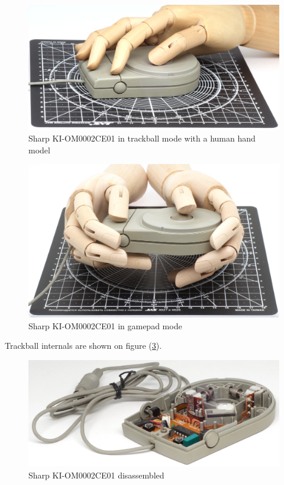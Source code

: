 \documentclass[11pt, a4paper]{article}
\begin{document}
\begin{figure}[h]
    \centering
    \includegraphics[scale=0.45]{1987_sharp_convertible/handball_30.jpg}
    \caption{Sharp KI-OM0002CE01 in trackball mode with a human hand model}
    \label{fig:SharpConvertibleBallHand}
\end{figure}

\begin{figure}[h]
    \centering
    \includegraphics[scale=0.31]{1987_sharp_convertible/handpad_30.jpg}
    \caption{Sharp KI-OM0002CE01 in gamepad mode}
    \label{fig:SharpConvertiblePadHand}
\end{figure}


Trackball internals are shown on figure (\ref{fig:SharpConvertibleInside}).

\begin{figure}[h]
    \centering
    \includegraphics[scale=0.7]{1987_sharp_convertible/inside_30.jpg}
    \caption{Sharp KI-OM0002CE01 disassembled}
    \label{fig:SharpConvertibleInside}
\end{figure}
\end{document}
